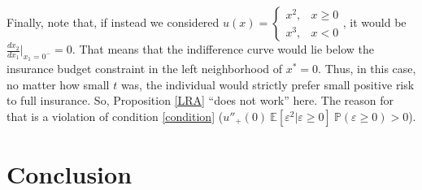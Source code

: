 \documentclass[a4paper]{article}
\newcommand{\prob}{\mathbb{P}}
\newcommand{\expect}{\mathbb{E}}
\newcommand{\eps}{\varepsilon}
\begin{document}
Finally, note that, if instead we considered $u(x) = \begin{cases}
	x^2, & x\ge0\\
	x^3, & x <0
\end{cases}$, it would be $\frac{dx_2}{dx_1}\bigg|_{x_1=0^-} = 0$. That means that the indifference curve would lie below the insurance budget constraint in the left neighborhood of $x^*=0$. Thus, in this case, no matter how small $t$ was, the individual would strictly prefer small positive risk to full insurance. So, Proposition \ref{LRA} ``does not work'' here. The reason for that is a violation of condition \eqref{condition} ($u''_{+}(0)\  \expect[\eps^2|\eps\ge0]\ \prob(\eps\ge0)>0$).
\section{Conclusion}
	\newpage
	{}
	
	
\end{document}
